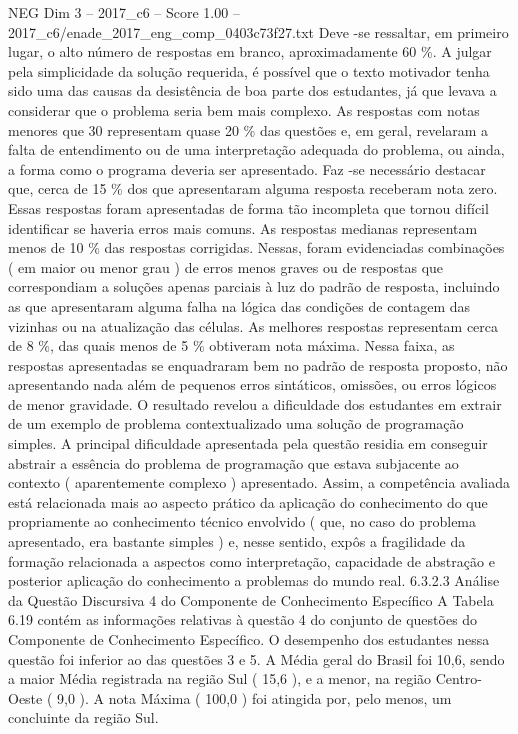 \begin{textsample}{NEG Dim 3 – 2017\_c6 – Score 1.00 – 2017\_c6/enade\_2017\_eng\_comp\_0403c73f27.txt}
Deve -se ressaltar, em primeiro lugar, o alto número de respostas em branco, aproximadamente 60 \%.
A julgar pela simplicidade da solução requerida, é possível que o texto motivador tenha sido uma das causas da desistência de boa parte dos estudantes, já que levava a considerar que o problema seria bem mais complexo.
As respostas com notas menores que 30 representam quase 20 \% das questões e, em geral, revelaram a falta de entendimento ou de uma interpretação adequada do problema, ou ainda, a forma como o programa deveria ser apresentado.
Faz -se necessário destacar que, cerca de 15 \% dos que apresentaram alguma resposta receberam nota zero.
Essas respostas foram apresentadas de forma tão incompleta que tornou difícil identificar se haveria erros mais comuns.
As respostas medianas representam menos de 10 \% das respostas corrigidas.
Nessas, foram evidenciadas combinações ( em maior ou menor grau ) de erros menos graves ou de respostas que correspondiam a soluções apenas parciais à luz do padrão de resposta, incluindo as que apresentaram alguma falha na lógica das condições de contagem das vizinhas ou na atualização das células.
As melhores respostas representam cerca de 8 \%, das quais menos de 5 \% obtiveram nota máxima.
Nessa faixa, as respostas apresentadas se enquadraram bem no padrão de resposta proposto, não apresentando nada além de pequenos erros sintáticos, omissões, ou erros lógicos de menor gravidade.
O resultado revelou a dificuldade dos estudantes em extrair de um exemplo de problema contextualizado uma solução de programação simples.
A principal dificuldade apresentada pela questão residia em conseguir abstrair a essência do problema de programação que estava subjacente ao contexto ( aparentemente complexo ) apresentado.
Assim, a competência avaliada está relacionada mais ao aspecto prático da aplicação do conhecimento do que propriamente ao conhecimento técnico envolvido ( que, no caso do problema apresentado, era bastante simples ) e, nesse sentido, expôs a fragilidade da formação relacionada a aspectos como interpretação, capacidade de abstração e posterior aplicação do conhecimento a problemas do mundo real. 6.3.2.3 Análise da Questão Discursiva 4 do Componente de Conhecimento Específico A Tabela 6.19 contém as informações relativas à questão 4 do conjunto de questões do Componente de Conhecimento Específico.
O desempenho dos estudantes nessa questão foi inferior ao das questões 3 e 5.
A Média geral do Brasil foi 10,6, sendo a maior Média registrada na região Sul ( 15,6 ), e a menor, na região Centro-Oeste ( 9,0 ).
A nota Máxima ( 100,0 ) foi atingida por, pelo menos, um concluinte da região Sul.

\end{textsample}
